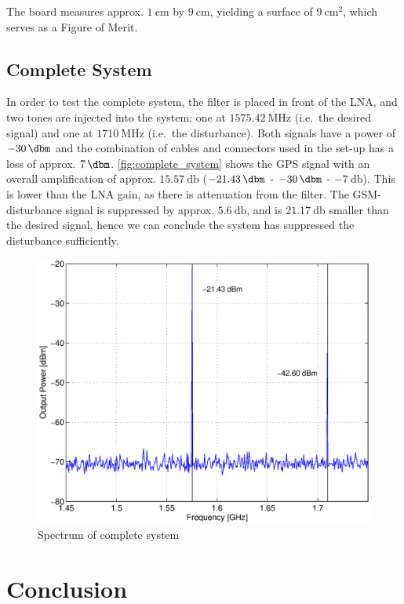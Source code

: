 \documentclass[a4paper]{article}        %
\begin{document}
  The board measures approx. $\SI{1}{\centi\meter}$ by $\SI{9}{\centi\meter}$, yielding a surface of $\SI{9}{\centi\meter\squared}$, which serves as a Figure of Merit. 

 
  \subsection{Complete System}
  In order to test the complete system, the filter is placed in front of the LNA, and two tones are injected into the system: one at $\SI{1575.42}{\mega\hertz}$ (i.e.\ the desired signal) and one at $\SI{1710}{\mega\hertz}$ (i.e.\ the disturbance).  
  Both signals have a power of $\SI{-30}{\dbm}$ and the combination of cables and connectors used in the set-up has a loss of approx. $\SI{7}{\dbm}$.
  \autoref{fig:complete_system} shows the GPS signal with an overall amplification of approx. $\SI{15.57}{\decibel}$ ($\SI{-21.43}{\dbm}$ - $\SI{-30}{\dbm}$ - $\SI{-7}{\decibel}$). This is lower than the LNA gain, as there is attenuation from the filter.
  The GSM-disturbance signal is suppressed by approx. $\SI{5.6}{\decibel}$, and is $\SI{21.17}{\decibel}$ smaller than the desired signal, hence we can conclude the system has suppressed the disturbance sufficiently.
  \begin{figure}[H]
    \centering
    \includegraphics[width=\textwidth]{fig/Filter/spectrum_system.eps}
    \caption{Spectrum of complete system}
    \label{fig:complete_system}
  \end{figure}
\section{Conclusion}
\end{document}
